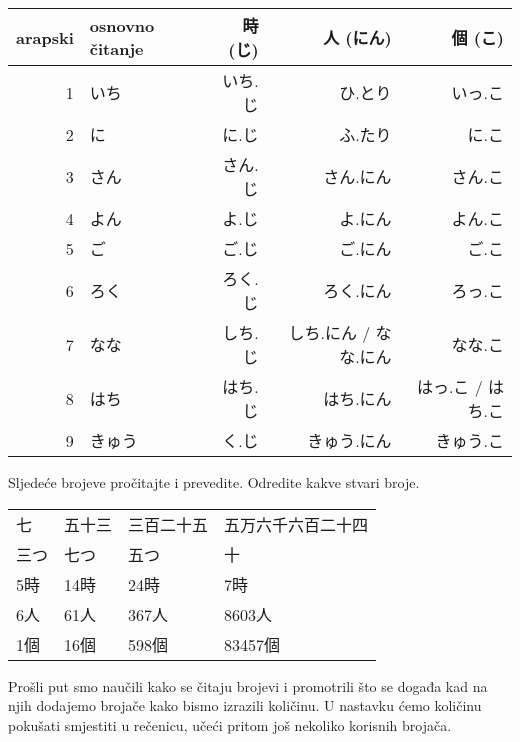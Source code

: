 	\begin{table}[h]
		\centering
		\begin{tabular}{r l r r r}\toprule[2pt]
			arapski & osnovno čitanje & 時 (じ) & 人 (にん) & 個 (こ)\\
			\midrule
			1			& いち & いち.じ & ひ.とり\footnotemark[2] & \colorbox{blue!10}{いっ.こ} \\
			2			& に & に.じ & ふ.たり\footnotemark[2] & に.こ \\
			3			& さん & さん.じ & さん.にん & さん.こ \\
			4			& よん & \colorbox{blue!10}{よ.じ} & \colorbox{blue!10}{よ.にん} & よん.こ \\
			5			& ご & ご.じ & ご.にん & ご.こ \\
			6			& ろく & ろく.じ & ろく.にん & \colorbox{blue!10}{ろっ.こ} \\
			7			& なな & \colorbox{blue!10}{しち.じ} & しち.にん / なな.にん & なな.こ \\
			8			& はち & はち.じ & はち.にん & \colorbox{blue!10}{はっ.こ} / はち.こ \\
			9			& きゅう & \colorbox{blue!10}{く.じ} & きゅう.にん & きゅう.こ \\
			\bottomrule
		\end{tabular}
	\end{table}

	
	Sljedeće brojeve pročitajte i prevedite. Odredite kakve stvari broje.
	
	\vspace{5pt}
	\begin{tabular}{l l l l}
		七	&	五十三	&	三百二十五	&	五万六千六百二十四	\\
		三つ	&	七つ	&	五つ			&	十	\\
		5時	&	14時	&	24時			&	7時	\\
		6人	&	61人	&	367人		&	8603人	\\
		1個	&	16個	&	598個		&	83457個	\\
	\end{tabular}

	
\newpage
{}

	
	Prošli put smo naučili kako se čitaju brojevi i promotrili što se događa kad na njih dodajemo brojače kako bismo izrazili količinu. U nastavku ćemo količinu pokušati smjestiti u rečenicu, učeći pritom još nekoliko korisnih brojača.
	
